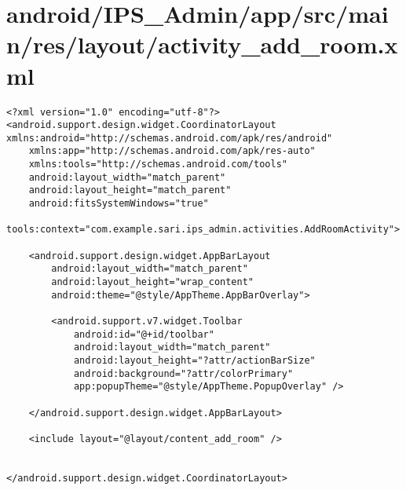 \section{android/IPS\_Admin/app/src/main/res/layout/activity_add_room.xml}
\begin{lstlisting}<?xml version="1.0" encoding="utf-8"?>
<android.support.design.widget.CoordinatorLayout xmlns:android="http://schemas.android.com/apk/res/android"
    xmlns:app="http://schemas.android.com/apk/res-auto"
    xmlns:tools="http://schemas.android.com/tools"
    android:layout_width="match_parent"
    android:layout_height="match_parent"
    android:fitsSystemWindows="true"
    tools:context="com.example.sari.ips_admin.activities.AddRoomActivity">

    <android.support.design.widget.AppBarLayout
        android:layout_width="match_parent"
        android:layout_height="wrap_content"
        android:theme="@style/AppTheme.AppBarOverlay">

        <android.support.v7.widget.Toolbar
            android:id="@+id/toolbar"
            android:layout_width="match_parent"
            android:layout_height="?attr/actionBarSize"
            android:background="?attr/colorPrimary"
            app:popupTheme="@style/AppTheme.PopupOverlay" />

    </android.support.design.widget.AppBarLayout>

    <include layout="@layout/content_add_room" />


</android.support.design.widget.CoordinatorLayout>
\end{lstlisting}
\newpage
